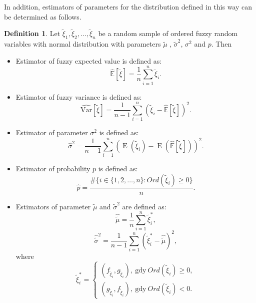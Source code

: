 \documentclass[review]{elsarticle}
\theoremstyle{definition}
\newtheorem{definition}{Definition}
\theoremstyle{theorem}
\DeclareMathOperator*{\E}{E}
\begin{document}
In addition, estimators of parameters for the distribution defined in this way can be determined as follows. 
\begin{definition}
Let $\tilde{\xi}_1, \tilde{\xi}_2, \ldots, \tilde{\xi}_n $  be a random sample of ordered fuzzy random variables with normal distribution with parameters $ \tilde{\mu} $ , $ \tilde{\sigma}^2 $, $\sigma^2 $ and $ p $. Then
\begin{itemize}
\item Estimator of fuzzy expected value is defined as:
\begin{equation}
\hat{\mathbb{E}}[\tilde{\xi}]=\frac{1}{n}\sum\limits_{i=1}^n\tilde{\xi}_i.
\end{equation}
\item Estimator of fuzzy variance is defined as:
\begin{equation}
\label{eq:esty1}
\hat{\mathrm{Var}}[\tilde{\xi}]=\frac{1}{n-1}\sum\limits_{i=1}^n\left(\tilde{\xi}_i-\hat{\mathbb{E}}[\tilde{\xi}]\right)^2.
\end{equation}
\item Estimator of parameter $\sigma^2$ is defined as:
\begin{equation}
\label{eq:esty2}
\hat{\sigma}^2=\frac{1}{n-1}\sum\limits_{i=1}^n\left(\E(\tilde{\xi}_i)-\E(\hat{\mathbb{E}}[\tilde{\xi}])\right)^2.
\end{equation}
\item Estimator of probability $p$ is defined as:
\begin{equation}
\hat{p}=\dfrac{\#\{i\in\{1,2,\ldots,n\}\colon Ord(\tilde{\xi}_i)\geq 0\}}{n}.
\end{equation}
\item Estimators of parameter $\tilde{\mu}$ and $\tilde{\sigma}^2$ are defined as:
\begin{equation}
\hat{\tilde{\mu}}=\frac{1}{n}\sum\limits_{i=1}^n\tilde{\xi}_i^{*},
\end{equation}
\begin{equation}
\hat{\tilde{\sigma}}^2 = \frac{1}{n-1}\sum\limits_{i=1}^n\left(\tilde{\xi}_i^{*}-\hat{\tilde{\mu}}\right)^2,
\end{equation}
where
\begin{equation}
\tilde{\xi}_i^{*}=\left\{
\begin{array}{l}
(f_{\tilde{\xi}_i},g_{\tilde{\xi}_i}),\ \text{gdy}\ Ord(\tilde{\xi}_i)\geq 0,\\
(g_{\tilde{\xi}_i},f_{\tilde{\xi}_i}),\ \text{gdy}\ Ord(\tilde{\xi}_i)< 0.
\end{array}
\right.
\end{equation}
\end{itemize}
\end{definition}
\end{document}
